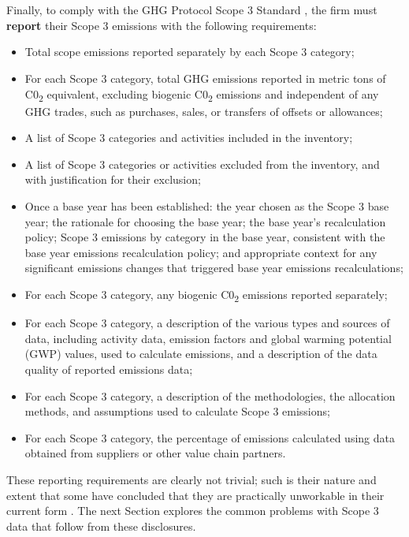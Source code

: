 \documentclass[12pt,twoside]{report}
\begin{document}
\\ \\
Finally, to comply with the GHG Protocol Scope 3 Standard \cite{ghgscope32013}, the firm must \textbf{report} their Scope 3 emissions with the following requirements:
\begin{itemize}
	\item Total scope emissions reported separately by each Scope 3 category;
	\item For each Scope 3 category, total GHG emissions reported in metric tons of C0\textsubscript{2} equivalent, excluding biogenic C0\textsubscript{2} emissions and independent of any GHG trades, such as purchases, sales, or transfers of offsets or allowances;
	\item A list of Scope 3 categories and activities included in the inventory;
	\item A list of Scope 3 categories or activities excluded from the inventory, and with justification for their exclusion;
	\item Once a base year has been established: the year chosen as the Scope 3 base year; the rationale for choosing the base year; the base year's recalculation policy; Scope 3 emissions by category in the base year, consistent with the base year emissions recalculation policy; and appropriate context for any significant emissions changes that triggered base year emissions recalculations;
	\item For each Scope 3 category, any biogenic C0\textsubscript{2} emissions reported separately; 
	\item For each Scope 3 category, a description of the various types and sources of data, including activity data, emission factors and global warming potential (GWP) values, used to calculate emissions, and a description of the data quality of reported emissions data;
	\item For each Scope 3 category, a description of the methodologies, the allocation methods, and assumptions used to calculate Scope 3 emissions;
	\item For each Scope 3 category, the percentage of emissions calculated using data obtained from suppliers or other value chain partners.
\end{itemize}
These reporting requirements are clearly not trivial; such is their nature and extent that some have concluded that they are practically unworkable in their current form \cite{patchell2018}. The next Section explores the common problems with Scope 3 data that follow from these disclosures.
\end{document}
